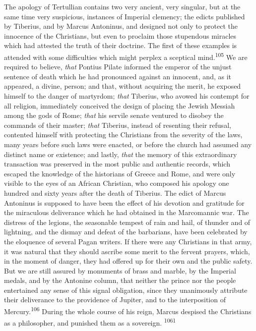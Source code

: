 The apology of Tertullian contains two very ancient, very
singular, but at the same time very suspicious, instances of
Imperial clemency; the edicts published by Tiberius, and by
Marcus Antoninus, and designed not only to protect the innocence
of the Christians, but even to proclaim those stupendous miracles
which had attested the truth of their doctrine. The first of
these examples is attended with some difficulties which might
perplex a sceptical mind.\textsuperscript{105} We are required to believe, \textit{that}
Pontius Pilate informed the emperor of the unjust sentence of
death which he had pronounced against an innocent, and, as it
appeared, a divine, person; and that, without acquiring the
merit, he exposed himself to the danger of martyrdom; \textit{that}
Tiberius, who avowed his contempt for all religion, immediately
conceived the design of placing the Jewish Messiah among the gods
of Rome; \textit{that} his servile senate ventured to disobey the
commands of their master; \textit{that} Tiberius, instead of resenting
their refusal, contented himself with protecting the Christians
from the severity of the laws, many years before such laws were
enacted, or before the church had assumed any distinct name or
existence; and lastly, \textit{that} the memory of this extraordinary
transaction was preserved in the most public and authentic
records, which escaped the knowledge of the historians of Greece
and Rome, and were only visible to the eyes of an African
Christian, who composed his apology one hundred and sixty years
after the death of Tiberius. The edict of Marcus Antoninus is
supposed to have been the effect of his devotion and gratitude
for the miraculous deliverance which he had obtained in the
Marcomannic war. The distress of the legions, the seasonable
tempest of rain and hail, of thunder and of lightning, and the
dismay and defeat of the barbarians, have been celebrated by the
eloquence of several Pagan writers. If there were any Christians
in that army, it was natural that they should ascribe some merit
to the fervent prayers, which, in the moment of danger, they had
offered up for their own and the public safety. But we are still
assured by monuments of brass and marble, by the Imperial medals,
and by the Antonine column, that neither the prince nor the
people entertained any sense of this signal obligation, since
they unanimously attribute their deliverance to the providence of
Jupiter, and to the interposition of Mercury.\textsuperscript{106} During the
whole course of his reign, Marcus despised the Christians as a
philosopher, and punished them as a sovereign. \textsuperscript{1061}

